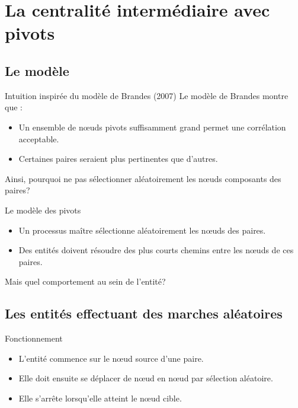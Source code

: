 \documentclass{beamer}
\begin{document}
\section{La centralité intermédiaire avec pivots}

	\subsection{Le modèle}

\begin{frame}
	\begin{block}{Intuition inspirée du modèle de Brandes (2007)}
		Le modèle de Brandes montre que :
		\begin{itemize}
			\item Un ensemble de n\oe uds pivots suffisamment grand permet une corrélation acceptable.
			\pause \item Certaines paires seraient plus pertinentes que d'autres.
		\end{itemize}
		\pause Ainsi, pourquoi ne pas sélectionner aléatoirement les n\oe uds composants des paires?
	\end{block}
\end{frame}

\begin{frame}
	\begin{block}{Le modèle des pivots}
		\begin{itemize}
		    \item Un processus maître sélectionne aléatoirement les n\oe uds des paires.
		    \pause \item Des entités doivent résoudre des plus courts chemins entre les n\oe uds de ces paires.
		\end{itemize}
		\pause Mais quel comportement au sein de l'entité?
	\end{block}
\end{frame}

	\subsection{Les entités effectuant des marches aléatoires}

\begin{frame}
	\begin{block}{Fonctionnement}
		\begin{itemize}
		    \item L'entité commence sur le n\oe ud source d'une paire.
		    \item Elle doit ensuite se déplacer de n\oe ud en n\oe ud par sélection aléatoire.
		    \item Elle s'arrête lorsqu'elle atteint le n\oe ud cible.
		\end{itemize}
	\end{block}
\end{frame}
\end{document}
